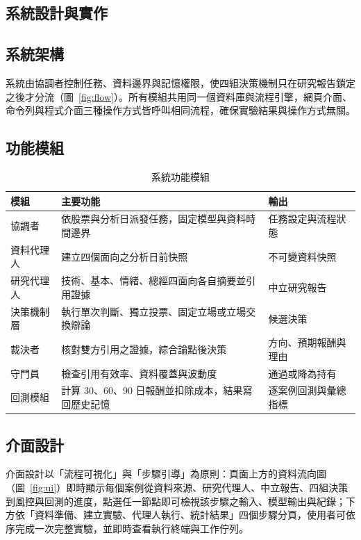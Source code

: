 \documentclass[12pt,a4paper]{article}
\begin{document}
\begin{CJK}{UTF8}{bkai}
\section{系統設計與實作}

\subsection{系統架構}

系統由協調者控制任務、資料邊界與記憶權限，使四組決策機制只在研究報告鎖定之後才分流（圖~\ref{fig:flow}）。所有模組共用同一個資料庫與流程引擎，網頁介面、命令列與程式介面三種操作方式皆呼叫相同流程，確保實驗結果與操作方式無關。

\subsection{功能模組}

\begin{table}[H]
\centering\small
\caption{系統功能模組}
\label{tab:modules}
\begin{tabularx}{\textwidth}{@{}l Y Y@{}}
\toprule
模組 & 主要功能 & 輸出 \\
\midrule
協調者 & 依股票與分析日派發任務，固定模型與資料時間邊界 & 任務設定與流程狀態 \\
資料代理人 & 建立四個面向之分析日前快照 & 不可變資料快照 \\
研究代理人 & 技術、基本、情緒、總經四面向各自摘要並引用證據 & 中立研究報告 \\
決策機制層 & 執行單次判斷、獨立投票、固定立場或立場交換辯論 & 候選決策 \\
裁決者 & 核對雙方引用之證據，綜合論點後決策 & 方向、預期報酬與理由 \\
守門員 & 檢查引用有效率、資料覆蓋與波動度 & 通過或降為持有 \\
回測模組 & 計算 30、60、90 日報酬並扣除成本，結果寫回歷史記憶 & 逐案例回測與彙總指標 \\
\bottomrule
\end{tabularx}
\end{table}

\subsection{介面設計}

介面設計以「流程可視化」與「步驟引導」為原則：頁面上方的資料流向圖（圖~\ref{fig:ui}）即時顯示每個案例從資料來源、研究代理人、中立報告、四組決策到風控與回測的進度，點選任一節點即可檢視該步驟之輸入、模型輸出與紀錄；下方依「資料準備、建立實驗、代理人執行、統計結果」四個步驟分頁，使用者可依序完成一次完整實驗，並即時查看執行終端與工作佇列。


\end{CJK}
\end{document}
